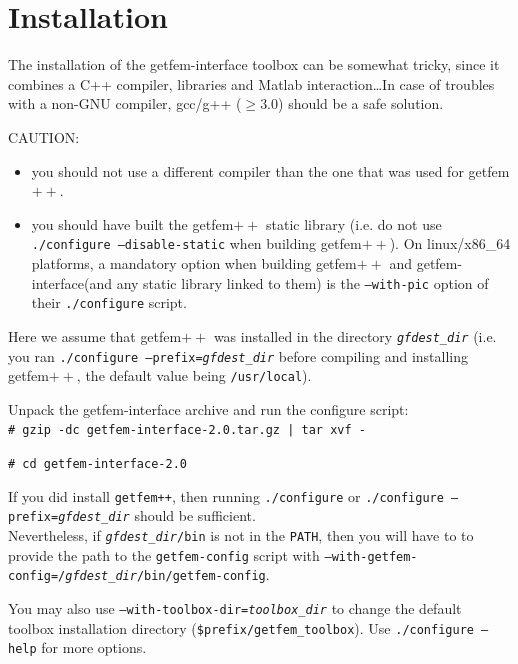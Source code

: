 \documentclass[11pt,a4paper]{article}
\newcommand{\vfill}{}
\newcommand{\newpage}{}
\newcommand{\sf}[1]{#1}
\newcommand{\Mlab}{{\sf Matlab\raisebox{4pt}{\tiny {\textregistered}}}\xspace}
\newcommand{\Mlab}{Matlab\xspace}
\newcommand{\gf}{{\sf getfem${++}$}\xspace}
\newcommand{\gfi}{{\sf getfem-interface}\xspace}
\begin{document}
\vfill
\begin{quote}

\end{quote}
\newpage
\tableofcontents
\newpage

\section{Installation}
The installation of the \gfi toolbox can be somewhat tricky, since it
combines a C++ compiler, libraries and \Mlab interaction\ldots In
case of troubles with a non-GNU compiler, gcc/g++ ($\geq3.0$) should be a
safe solution.

CAUTION: 
\begin{itemize}
  \item you should not use a different compiler than the one that was used for \gf.
  \item you should have built the \gf static library (i.e. do not use \texttt{./configure --disable-static} when building \gf). On linux/x86\_64 platforms, a mandatory option when building \gf and \gfi (and any static library linked to them) is the \texttt{--with-pic} option of their \texttt{./configure} script. 
\end{itemize}

Here we assume that \gf was installed in the directory
\texttt{\textit{gfdest_dir}} (i.e.  you ran \texttt{./configure --prefix=\textit{gfdest_dir}}
before compiling and installing \gf, the default value being
\texttt{/usr/local}).

Unpack the \gfi archive and run the configure script:\\[2mm]

\verb+# gzip -dc getfem-interface-2.0.tar.gz | tar xvf -+

\verb+# cd getfem-interface-2.0+

If you did install \texttt{getfem++}, then running 
\texttt{./configure} or \texttt{./configure --prefix=\textit{gfdest_dir}}
should be sufficient.\\

Nevertheless, if \texttt{\textit{gfdest_dir}/bin} is not in the \texttt{PATH}, then you will 
have to to provide the path to the \texttt{getfem-config} script
with \texttt{--with-getfem-config=/\textit{gfdest_dir}/bin/getfem-config}.

You may also use \texttt{--with-toolbox-dir=\textit{toolbox_dir}} to
change the default toolbox installation directory (\texttt{\$prefix/getfem_toolbox}).
Use \texttt{./configure --help} for more options.\\[2mm]
\end{document}
